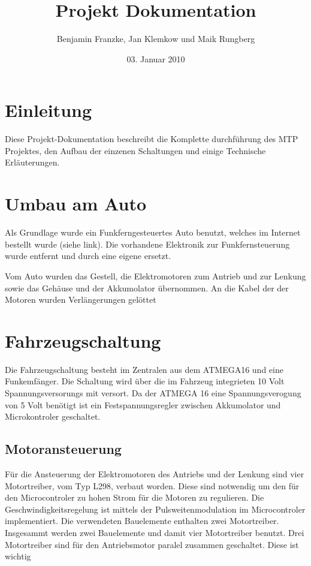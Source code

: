 \documentclass{scrartcl}
\title{Projekt Dokumentation}
\author{Benjamin Franzke, Jan Klemkow und Maik Rungberg}
\date{03. Januar 2010}
\begin{document}
\maketitle
\tableofcontents

\section{Einleitung} %
	Diese Projekt-Dokumentation beschreibt die Komplette durchführung des MTP Projektes, den Aufbau der einzenen Schaltungen und einige Technische Erläuterungen.

\section{Umbau am Auto} %
	Als Grundlage wurde ein Funkferngesteuertes Auto benutzt,
	welches im Internet bestellt wurde (siehe link).
	Die vorhandene Elektronik zur Funkfernsteuerung wurde entfernt und durch eine eigene ersetzt.

	Vom Auto wurden das Gestell, die Elektromotoren zum Antrieb und zur Lenkung sowie das Gehäuse und der Akkumolator übernommen.
	An die Kabel der der Motoren wurden Verlängerungen gelöttet 

\section{Fahrzeugschaltung} %
	Die Fahrzeugschaltung besteht im Zentralen aus dem ATMEGA16 und eine Funkemfänger.
	Die Schaltung wird über die im Fahrzeug integrieten 10 Volt Spannungsversorungs mit versort.
	Da der ATMEGA 16 eine Spannungsverogung von 5 Volt benötigt ist ein Festspannungsregler
	zwischen Akkumolator und Microkontroler geschaltet.

	\subsection{Motoransteuerung}
		Für die Ansteuerung der Elektromotoren des Antriebs und der Lenkung sind vier Motortreiber, vom Typ L298, verbaut worden.
		Diese sind notwendig um den für den Microcontroler zu hohen Strom für die Motoren zu regulieren.
		Die Geschwindigkeitsregelung ist mittels der Pulsweitenmodulation im Microcontroler implementiert.
		Die verwendeten Bauelemente enthalten zwei Motortreiber. Insgesammt werden zwei Bauelemente und damit vier Motortreiber benutzt.
		Drei Motortreiber sind für den Antriebsmotor paralel zusammen geschaltet. Diese ist wichtig
\end{document}
